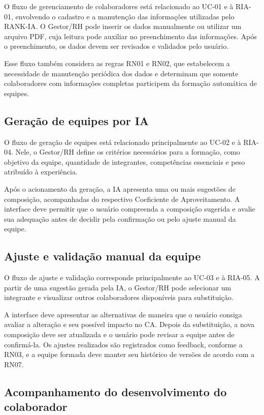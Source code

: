 \documentclass[a4paper,12pt,oneside,openany]{book}
\begin{document}
O fluxo de gerenciamento de colaboradores está relacionado ao UC-01 e à RIA-01, envolvendo o cadastro e a manutenção das informações utilizadas pelo RANK-IA. O Gestor/RH pode inserir os dados manualmente ou utilizar um arquivo PDF, cuja leitura pode auxiliar no preenchimento das informações. Após o preenchimento, os dados devem ser revisados e validados pelo usuário.

Esse fluxo também considera as regras RN01 e RN02, que estabelecem a necessidade de manutenção periódica dos dados e determinam que somente colaboradores com informações completas participem da formação automática de equipes.

\subsection{Geração de equipes por IA}

O fluxo de geração de equipes está relacionado principalmente ao UC-02 e à RIA-04. Nele, o Gestor/RH define os critérios necessários para a formação, como objetivo da equipe, quantidade de integrantes, competências essenciais e peso atribuído à experiência.

Após o acionamento da geração, a IA apresenta uma ou mais sugestões de composição, acompanhadas do respectivo Coeficiente de Aproveitamento. A interface deve permitir que o usuário compreenda a composição sugerida e avalie sua adequação antes de decidir pela confirmação ou pelo ajuste manual da equipe.

\subsection{Ajuste e validação manual da equipe}

O fluxo de ajuste e validação corresponde principalmente ao UC-03 e à RIA-05. A partir de uma sugestão gerada pela IA, o Gestor/RH pode selecionar um integrante e visualizar outros colaboradores disponíveis para substituição.

A interface deve apresentar as alternativas de maneira que o usuário consiga avaliar a alteração e seu possível impacto no CA. Depois da substituição, a nova composição deve ser atualizada e o usuário pode revisar a equipe antes de confirmá-la. Os ajustes realizados são registrados como feedback, conforme a RN03, e a equipe formada deve manter seu histórico de versões de acordo com a RN07.

\subsection{Acompanhamento do desenvolvimento do colaborador}
\end{document}
